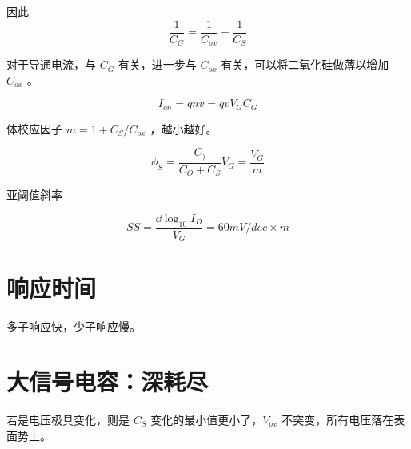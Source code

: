 \documentclass[cn,11pt,chinese,black,simple]{../elegantbook}
\begin{document}
因此 \[\frac{1}{C_G} = \frac{1}{C_{ox}} + \frac{1}{C_S}\]

对于导通电流，与 \(C_G\) 有关，进一步与 \(C_{ox}\) 有关，可以将二氧化硅做薄以增加 \(C_{ox}\) 。

\[I_{on} = q n v = q v V_G C_G \] 

体校应因子 \(m = 1 + C_S / C_{ox}\) ，越小越好。

\[\phi_S = \frac{C_)}{C_O + C_S}V_G = \frac{V_G}{m}\]

亚阈值斜率 

\[SS = \frac{\dd{\log _{10} I_D}}{V_G} = 60 mV/dec \times m\]


\section{响应时间}

多子响应快，少子响应慢。

\section{大信号电容：深耗尽}

若是电压极具变化，则是 \(C_S\) 变化的最小值更小了，\(V_{ox}\) 不突变，所有电压落在表面势上。




\let\chapname\undefined
\ifx\mainclass\undefined
\end{document}
